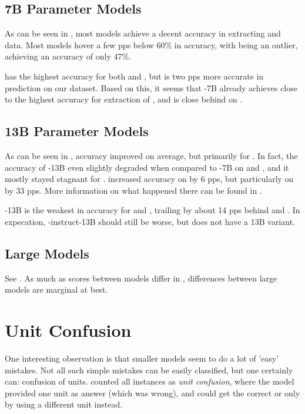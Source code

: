 \subsection{7B Parameter Models}\label{sub:result:7b}
As can be seen in , most models achieve a decent accuracy in extracting \ttemp and \ttime data.
Most models hover a few \glspl{pp} below 60\% in \tsolv accuracy, with  being an outlier, achieving an accuracy of only 47\%.

 has the highest accuracy for both \ttemp and \ttime, but  is two \glspl{pp} more accurate in \tsolv prediction on our dataset.
Based on this, it seems that -7B already achieves close to the highest accuracy for extraction of \ttemp, and is close behind on \ttime.


\subsection{13B Parameter Models}\label{sub:result:13b}

As can be seen in , accuracy improved on average, but primarily for .
In fact, the accuracy of -13B even slightly degraded when compared to -7B on \ttemp and \ttime, and it mostly stayed stagnant for .
 increased accuracy on \ttemp by 6 \glspl{pp}, but particularly on \ttime by 33 \glspl{pp}. More information on what happened there can be found in .

-13B is the weakest in accuracy for \ttemp and \ttime, trailing by about 14 \glspl{pp} behind  and . In expecation, -instruct-13B should still be worse, but  does not have a 13B variant.

\subsection{Large Models}\label{sub:result:large}
See . As much as scores between models differ in , differences between large models are marginal at best. 

\section{Unit Confusion}\label{sec:unitconfusion}



One interesting observation is that smaller models seem to do a lot of 'easy' mistakes.
Not all such simple mistakes can be easily classified, but one certainly can: confusion of units.
 counted all instances as \textit{unit confusion}, where the model provided one unit as answer (which was wrong), and  could get the correct \ttemp or \ttime only by using a different unit instead.

